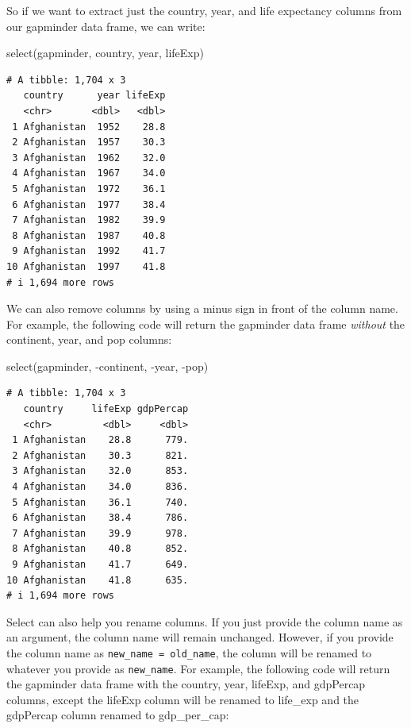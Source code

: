 \documentclass[
  letterpaper,
  DIV=11,
  numbers=noendperiod]{scrreprt}
\newenvironment{Shaded}{\begin{snugshade}}{\end{snugshade}}
\newcommand{\FunctionTok}[1]{\textcolor[rgb]{0.28,0.35,0.67}{#1}}
\newcommand{\NormalTok}[1]{\textcolor[rgb]{0.00,0.23,0.31}{#1}}
\newcommand{\SpecialCharTok}[1]{\textcolor[rgb]{0.37,0.37,0.37}{#1}}
\begin{document}
So if we want to extract just the country, year, and life expectancy
columns from our gapminder data frame, we can write:

\begin{Shaded}
\begin{Highlighting}[]
\FunctionTok{select}\NormalTok{(gapminder, country, year, lifeExp)}
\end{Highlighting}
\end{Shaded}

\begin{verbatim}
# A tibble: 1,704 x 3
   country      year lifeExp
   <chr>       <dbl>   <dbl>
 1 Afghanistan  1952    28.8
 2 Afghanistan  1957    30.3
 3 Afghanistan  1962    32.0
 4 Afghanistan  1967    34.0
 5 Afghanistan  1972    36.1
 6 Afghanistan  1977    38.4
 7 Afghanistan  1982    39.9
 8 Afghanistan  1987    40.8
 9 Afghanistan  1992    41.7
10 Afghanistan  1997    41.8
# i 1,694 more rows
\end{verbatim}

We can also remove columns by using a minus sign in front of the column
name. For example, the following code will return the gapminder data
frame \emph{without} the continent, year, and pop columns:

\begin{Shaded}
\begin{Highlighting}[]
\FunctionTok{select}\NormalTok{(gapminder, }\SpecialCharTok{{-}}\NormalTok{continent, }\SpecialCharTok{{-}}\NormalTok{year, }\SpecialCharTok{{-}}\NormalTok{pop)}
\end{Highlighting}
\end{Shaded}

\begin{verbatim}
# A tibble: 1,704 x 3
   country     lifeExp gdpPercap
   <chr>         <dbl>     <dbl>
 1 Afghanistan    28.8      779.
 2 Afghanistan    30.3      821.
 3 Afghanistan    32.0      853.
 4 Afghanistan    34.0      836.
 5 Afghanistan    36.1      740.
 6 Afghanistan    38.4      786.
 7 Afghanistan    39.9      978.
 8 Afghanistan    40.8      852.
 9 Afghanistan    41.7      649.
10 Afghanistan    41.8      635.
# i 1,694 more rows
\end{verbatim}

Select can also help you rename columns. If you just provide the column
name as an argument, the column name will remain unchanged. However, if
you provide the column name as \texttt{new\_name\ =\ old\_name}, the
column will be renamed to whatever you provide as \texttt{new\_name}.
For example, the following code will return the gapminder data frame
with the country, year, lifeExp, and gdpPercap columns, except the
lifeExp column will be renamed to life\_exp and the gdpPercap column
renamed to gdp\_per\_cap:
\end{document}
